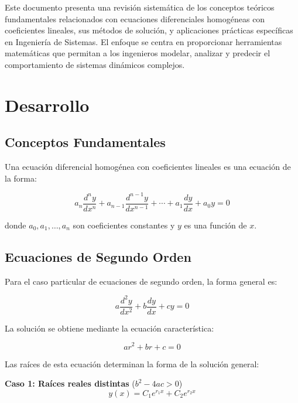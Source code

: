 \documentclass[12pt]{article}
\begin{document}
Este documento presenta una revisión sistemática de los conceptos teóricos fundamentales relacionados con ecuaciones diferenciales homogéneas con coeficientes lineales, sus métodos de solución, y aplicaciones prácticas específicas en Ingeniería de Sistemas. El enfoque se centra en proporcionar herramientas matemáticas que permitan a los ingenieros modelar, analizar y predecir el comportamiento de sistemas dinámicos complejos.

\section{Desarrollo}

\subsection{Conceptos Fundamentales}

Una ecuación diferencial homogénea con coeficientes lineales es una ecuación de la forma:

\begin{equation}
    a_n \frac{d^n y}{dx^n} + a_{n-1} \frac{d^{n-1} y}{dx^{n-1}} + \cdots + a_1 \frac{dy}{dx} + a_0 y = 0
\end{equation}

donde $a_0, a_1, \ldots, a_n$ son coeficientes constantes y $y$ es una función de $x$.

\subsection{Ecuaciones de Segundo Orden}

Para el caso particular de ecuaciones de segundo orden, la forma general es:

\begin{equation}
    a \frac{d^2 y}{dx^2} + b \frac{dy}{dx} + c y = 0
\end{equation}

La solución se obtiene mediante la ecuación característica:

\begin{equation}
    ar^2 + br + c = 0
\end{equation}

Las raíces de esta ecuación determinan la forma de la solución general:

\textbf{Caso 1: Raíces reales distintas} ($b^2 - 4ac > 0$)
\begin{equation}
    y(x) = C_1 e^{r_1 x} + C_2 e^{r_2 x}
\end{equation}
\end{document}
